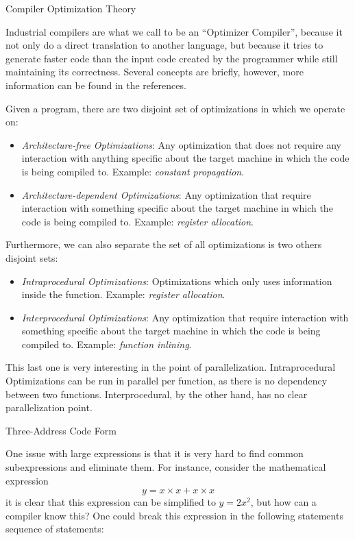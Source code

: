 \begin{section}{Compiler Optimization Theory}

Industrial compilers are what we call to be an ``Optimizer Compiler'', because
it not only do a direct translation to another language, but because it
tries to generate faster code than the input code created by the programmer
while still maintaining its correctness. Several concepts are briefly, however,
more information can be found in the references.

Given a program, there are two disjoint set of optimizations in which we
operate on:
\begin{itemize}
	\item \textit{Architecture-free Optimizations}: Any optimization that
	does not require any interaction with anything specific about the target
	machine in which the code is being compiled to. Example: \textit{constant
	propagation}.


	\item \textit{Architecture-dependent Optimizations}: Any optimization that
	require interaction with something specific about the target machine in
	which the code is being compiled to. Example: \textit{register allocation}.
\end{itemize}

Furthermore, we can also separate the set of all optimizations is two
others disjoint sets:

\begin{itemize}
	\item \textit{Intraprocedural Optimizations}: Optimizations which only uses
	information inside the function. Example: \textit{register allocation}.

	\item \textit{Interprocedural Optimizations}: Any optimization that
	require interaction with something specific about the target machine in
	which the code is being compiled to. Example: \textit{function inlining}.
\end{itemize}

This last one is very interesting in the point of parallelization. Intraprocedural
Optimizations can be run in parallel per function, as there is no dependency between
two functions. Interprocedural, by the other hand, has no clear parallelization point.

\begin{subsubsection}{Three-Address Code Form}

One issue with large expressions is that it is very hard to find common
subexpressions and eliminate them. For instance, consider the mathematical
expression
$$y = x \times x + x \times x $$
it is clear that this expression can be simplified to $y = 2x^2$, but how
can a compiler know this? One could break this expression in the following
statements sequence of statements:


\end{subsubsection}
\end{section}

